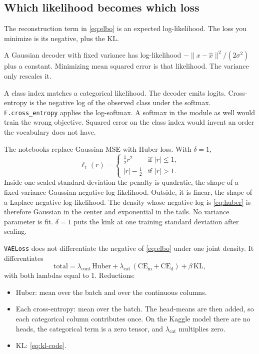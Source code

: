 \documentclass[11pt]{article}
\begin{document}
\subsection{Which likelihood becomes which loss}

The reconstruction term in \eqref{eq:elbo} is an expected log-likelihood.
The loss you minimize is its negative, plus the KL.

A Gaussian decoder with fixed variance has log-likelihood
$-\|x-\hat{x}\|^{2}/(2\sigma^{2})$ plus a constant. Minimizing mean
squared error is that likelihood. The variance only rescales it.

A class index matches a categorical likelihood. The decoder emits logits.
Cross-entropy is the negative log of the observed class under the softmax.
\texttt{F.cross\_entropy} applies the log-softmax. A softmax in the module
as well would train the wrong objective. Squared error on the class index
would invent an order the vocabulary does not have.

The notebooks replace Gaussian MSE with Huber loss. With $\delta=1$,
\begin{equation}
\label{eq:huber}
\ell_{1}(r)=
\begin{cases}
\tfrac{1}{2} r^{2} & \text{if } |r|\le 1,\\
|r|-\tfrac{1}{2} & \text{if } |r|>1.
\end{cases}
\end{equation}
Inside one scaled standard deviation the penalty is quadratic, the shape
of a fixed-variance Gaussian negative log-likelihood. Outside, it is
linear, the shape of a Laplace negative log-likelihood. The density whose
negative log is \eqref{eq:huber} is therefore Gaussian in the center and
exponential in the tails. No variance parameter is fit. $\delta=1$ puts
the kink at one training standard deviation after scaling.

\texttt{VAELoss} does not differentiate the negative of \eqref{eq:elbo}
under one joint density. It differentiates
\begin{equation}
\label{eq:train-loss}
\mathrm{total}
= \lambda_{\mathrm{cont}}\,\mathrm{Huber}
+ \lambda_{\mathrm{cat}}\,(\mathrm{CE}_{\mathrm{m}}+\mathrm{CE}_{\mathrm{d}})
+ \beta\,\mathrm{KL},
\end{equation}
with both lambdas equal to 1. Reductions:

\begin{itemize}
\item Huber: mean over the batch and over the continuous columns.
\item Each cross-entropy: mean over the batch. The head-means are then
  added, so each categorical column contributes once. On the Kaggle model
  there are no heads, the categorical term is a zero tensor, and
  $\lambda_{\mathrm{cat}}$ multiplies zero.
\item KL: \eqref{eq:kl-code}.
\end{itemize}
\end{document}
